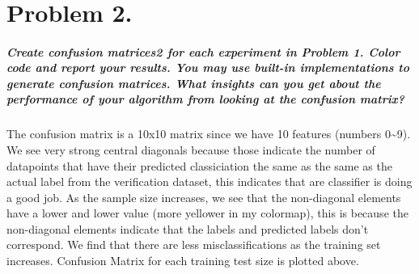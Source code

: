 \documentclass{article}
\begin{document}
    \begin{center}
    \end{center}
    { \hspace*{\fill} \\}
    
    \section{\textbf{Problem 2.}}\label{problem-2.}

    \subparagraph{Create confusion matrices2 for each experiment in Problem
1. Color code and report your results. You may use built-in
implementations to generate confusion matrices. What insights can you
get about the performance of your algorithm from looking at the
confusion
matrix?}\label{create-confusion-matrices2-for-each-experiment-in-problem-1.-color-code-and-report-your-results.-you-may-use-built-in-implementations-to-generate-confusion-matrices.-what-insights-can-you-get-about-the-performance-of-your-algorithm-from-looking-at-the-confusion-matrix}

    The confusion matrix is a 10x10 matrix since we have 10 features
(numbers 0\textasciitilde{}9). We see very strong central diagonals
because those indicate the number of datapoints that have their
predicted classiciation the same as the same as the actual label from
the verification dataset, this indicates that are classifier is doing a
good job. As the sample size increases, we see that the non-diagonal
elements have a lower and lower value (more yellower in my colormap),
this is because the non-diagonal elements indicate that the labels and
predicted labels don't correspond. We find that there are less
misclassifications as the training set increases. Confusion Matrix for
each training test size is plotted above.
\end{document}
